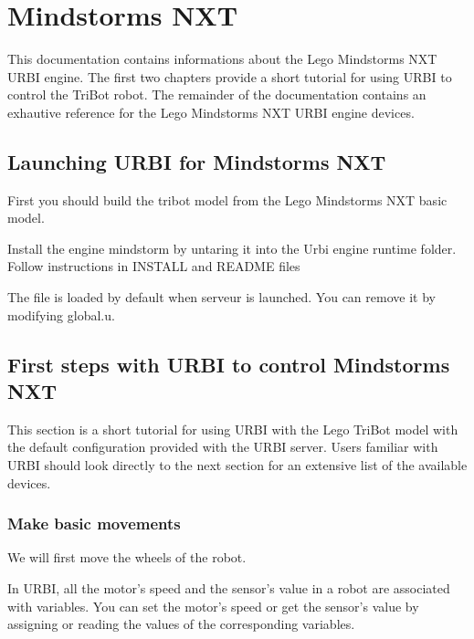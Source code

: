 
\chapter{Mindstorms NXT}
\label{sec:nxt}

This documentation contains informations about the Lego Mindstorms NXT
URBI engine.  The first two chapters provide a short tutorial for
using URBI to control the TriBot robot.  The remainder of the
documentation contains an exhautive reference for the Lego Mindstorms
NXT URBI engine devices.

\section{Launching URBI for Mindstorms NXT}

First you should build the tribot model from the Lego Mindstorms NXT basic
model.

Install the engine mindstorm by untaring it into the Urbi engine runtime
folder. Follow instructions in INSTALL and README files

The file  is loaded by default when serveur is launched. You
can remove it by modifying global.u.

\section{First steps with URBI to control Mindstorms NXT}

This section is a short tutorial for using URBI with the Lego TriBot model with
the default configuration provided with the URBI server. Users familiar with
URBI should look directly to the next section for an extensive list of the
available devices.

\subsection{Make basic movements}

We will first move the wheels of the robot.

In URBI, all the motor's speed and the sensor's value in a robot are associated
with variables. You can set the motor's speed or get the sensor's value by
assigning or reading the values of the corresponding variables.

